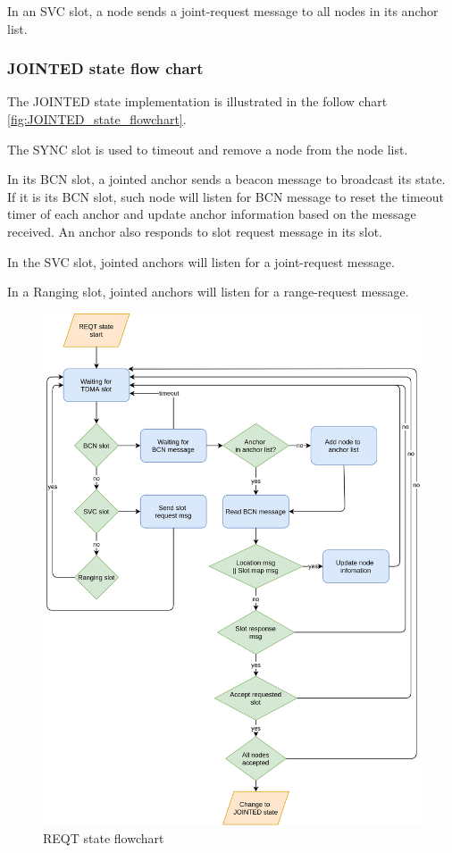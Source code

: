 \documentclass[\main/main.tex]{subfiles}
\begin{document}
In an SVC slot, a node sends a joint-request message to all nodes in its anchor list.


\subsubsection{JOINTED state flow chart}
The JOINTED state implementation is illustrated in the follow chart \ref{fig:JOINTED_state_flowchart}.

The SYNC slot is used to timeout and remove a node from the node list.

In its BCN slot, a jointed anchor sends a beacon message to broadcast its state. If it is its BCN slot, such node will listen for BCN message to reset the timeout timer of each anchor and update anchor information based on the message received. An anchor also responds to slot request message in its slot.

In the SVC slot, jointed anchors will listen for a joint-request message.

In a Ranging slot, jointed anchors will listen for a range-request message.

\begin{figure}[H]
    \begin{center}
        \includegraphics[scale=0.3]{REQT_flow_chart.png}
    \end{center}
    \caption{REQT state flowchart}
    \label{fig:REQT_state_flowchart}
\end{figure}
\end{document}

